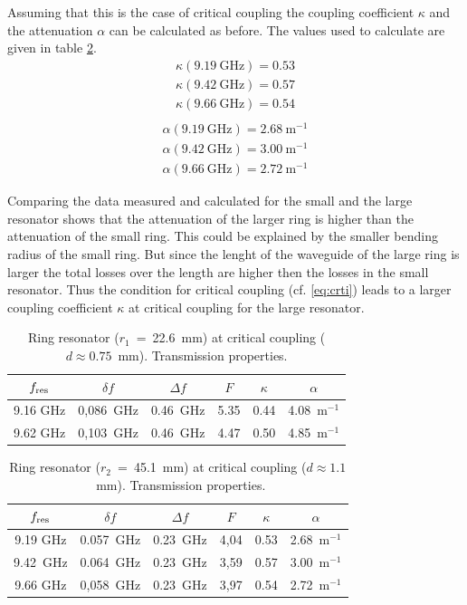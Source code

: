 Assuming that this is the case of critical coupling the coupling coefficient $\kappa$ and the attenuation $\alpha$ can be calculated as before. The values used to calculate are given in table \ref{tab:ring_gross}.
\begin{equation}
\begin{split}
\kappa(9.19~\mathrm{GHz})=0.53\\
\kappa(9.42~\mathrm{GHz})=0.57\\
\kappa(9.66~\mathrm{GHz})=0.54\\
\end{split}
\label{eq:}
\end{equation}
\begin{equation}
\begin{split}
\alpha(9.19~\mathrm{GHz})=2.68~\mathrm{m}^{-1}\\
\alpha(9.42~\mathrm{GHz})=3.00~\mathrm{m}^{-1}\\
\alpha(9.66~\mathrm{GHz})=2.72~\mathrm{m}^{-1}
\end{split}
\label{eq:}
\end{equation}

Comparing the data measured and calculated for the small and the large resonator shows that the attenuation of the larger ring is higher than the attenuation of the small ring. This could be explained by the smaller bending radius of the small ring. 
But since the lenght of the waveguide of the large ring is larger the total losses over the length are higher then the losses in the small resonator. Thus the condition for critical coupling (cf. \eqref{eq:crti}) leads to a larger coupling coefficient $\kappa$ at critical coupling for the large resonator.

\begin{table}%
\centering
\caption{Ring resonator ($r_1$~=~22.6~mm) at critical coupling ($d \approx 0.75$~mm). Transmission properties.}
\begin{tabular}{cccccc}
\toprule
$f_{\mathrm{res}}$	& $\delta f$	& $\Delta f$ & $F$ & $\kappa$ & $\alpha$\\
\midrule
9.16 GHz	& 0,086~GHz	& 0.46~GHz	&	5.35&	0.44 & 4.08~m$^{-1}$\\
9.62 GHz	& 0,103~GHz	& 0.46~GHz	&	4.47	&	0.50 & 4.85~m$^{-1}$\\
\bottomrule 
\end{tabular}
\label{tab:ring_klein}
\end{table}

\begin{table}%
\centering
\caption{Ring resonator ($r_2$~=~45.1~mm) at critical coupling ($d \approx 1.1$~mm). Transmission properties.}
\begin{tabular}{cccccc}
\toprule
$f_{\mathrm{res}}$	& $\delta f$	& $\Delta f$ & $F$ & $\kappa$ & $\alpha$\\
\midrule
9.19 GHz	& 0.057~GHz	& 0.23~GHz	& 4,04	& 0.53	& 2.68~m$^{-1}$ \\
9.42~GHz	&	0.064~GHz	&	0.23~GHz	& 3,59	& 0.57	&	3.00~m$^{-1}$\\
9.66 GHz	& 0,058~GHz	& 0.23~GHz	&	3,97	&	0.54	& 2.72~m$^{-1}$ \\
\bottomrule 
\end{tabular}
\label{tab:ring_gross}
\end{table}

